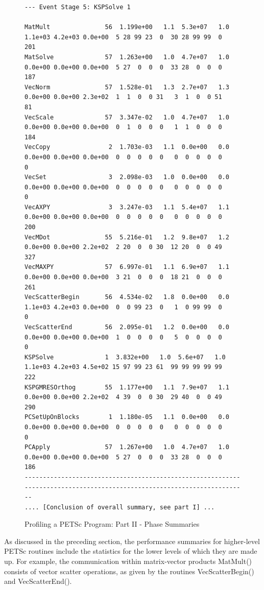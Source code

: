 \begin{figure}[tb]
{\begin{verbatim}
--- Event Stage 5: KSPSolve 1

MatMult               56  1.199e+00   1.1  5.3e+07   1.0  1.1e+03 4.2e+03 0.0e+00  5 28 99 23  0  30 28 99 99  0   201
MatSolve              57  1.263e+00   1.0  4.7e+07   1.0  0.0e+00 0.0e+00 0.0e+00  5 27  0  0  0  33 28  0  0  0   187
VecNorm               57  1.528e-01   1.3  2.7e+07   1.3  0.0e+00 0.0e+00 2.3e+02  1  1  0  0 31   3  1  0  0 51    81
VecScale              57  3.347e-02   1.0  4.7e+07   1.0  0.0e+00 0.0e+00 0.0e+00  0  1  0  0  0   1  1  0  0  0   184
VecCopy                2  1.703e-03   1.1  0.0e+00   0.0  0.0e+00 0.0e+00 0.0e+00  0  0  0  0  0   0  0  0  0  0     0
VecSet                 3  2.098e-03   1.0  0.0e+00   0.0  0.0e+00 0.0e+00 0.0e+00  0  0  0  0  0   0  0  0  0  0     0
VecAXPY                3  3.247e-03   1.1  5.4e+07   1.1  0.0e+00 0.0e+00 0.0e+00  0  0  0  0  0   0  0  0  0  0   200
VecMDot               55  5.216e-01   1.2  9.8e+07   1.2  0.0e+00 0.0e+00 2.2e+02  2 20  0  0 30  12 20  0  0 49   327
VecMAXPY              57  6.997e-01   1.1  6.9e+07   1.1  0.0e+00 0.0e+00 0.0e+00  3 21  0  0  0  18 21  0  0  0   261
VecScatterBegin       56  4.534e-02   1.8  0.0e+00   0.0  1.1e+03 4.2e+03 0.0e+00  0  0 99 23  0   1  0 99 99  0     0
VecScatterEnd         56  2.095e-01   1.2  0.0e+00   0.0  0.0e+00 0.0e+00 0.0e+00  1  0  0  0  0   5  0  0  0  0     0
KSPSolve              1  3.832e+00   1.0  5.6e+07   1.0  1.1e+03 4.2e+03 4.5e+02 15 97 99 23 61  99 99 99 99 99   222
KSPGMRESOrthog        55  1.177e+00   1.1  7.9e+07   1.1  0.0e+00 0.0e+00 2.2e+02  4 39  0  0 30  29 40  0  0 49   290
PCSetUpOnBlocks        1  1.180e-05   1.1  0.0e+00   0.0  0.0e+00 0.0e+00 0.0e+00  0  0  0  0  0   0  0  0  0  0     0
PCApply               57  1.267e+00   1.0  4.7e+07   1.0  0.0e+00 0.0e+00 0.0e+00  5 27  0  0  0  33 28  0  0  0   186
------------------------------------------------------------------------------------------------------------------------
.... [Conclusion of overall summary, see part I] ...
\end{verbatim}
}
\caption{Profiling a PETSc Program: Part II - Phase Summaries}
\label{fig_exparprof2}
\end{figure}

As discussed in the preceding section, the performance summaries for
higher-level PETSc routines include the statistics for the lower
levels of which they are made up.  For example, the communication within
matrix-vector products MatMult() consists of vector scatter
operations, as given by the routines VecScatterBegin() and VecScatterEnd().
%
%

